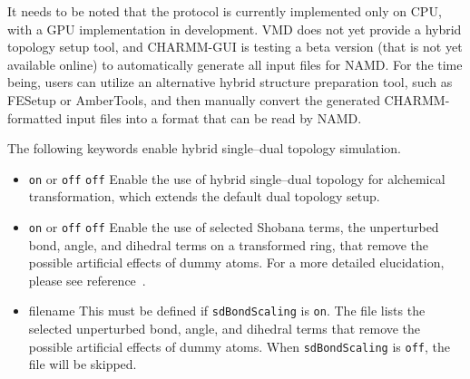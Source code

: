 It needs to be noted that the protocol is currently
implemented only on CPU, with a GPU implementation in development.
VMD does not yet provide a hybrid topology setup tool,
and CHARMM-GUI is testing a beta version
(that is not yet available online)
to automatically generate all input files for NAMD.
For the time being, users can utilize an alternative hybrid structure
preparation tool, such as FESetup or AmberTools, and then manually
convert the generated CHARMM-formatted input files into a
format that can be read by NAMD.

The following keywords enable hybrid single--dual topology
simulation.
\begin{itemize}

\item
{}
{{\tt on} or {\tt off}}
{{\tt off}}
{Enable the use of hybrid single--dual topology
for alchemical transformation,
which extends the default dual topology setup.}

\item
{}
{{\tt on} or {\tt off}}
{{\tt off}}
{Enable the use of selected Shobana terms,
the unperturbed bond, angle, and dihedral terms on a transformed ring,
that remove the possible artificial effects of dummy atoms.
For a more detailed elucidation, please see reference~\cite{Shobana2000}.
}

\item
{}
{filename}
{This must be defined if {\tt sdBondScaling} is {\tt on}.
The file lists the selected unperturbed bond, angle, and dihedral terms
that remove the possible artificial effects of dummy atoms.
When {\tt sdBondScaling} is {\tt off}, the file will be skipped.
}

\end{itemize}

%
%
%

%
